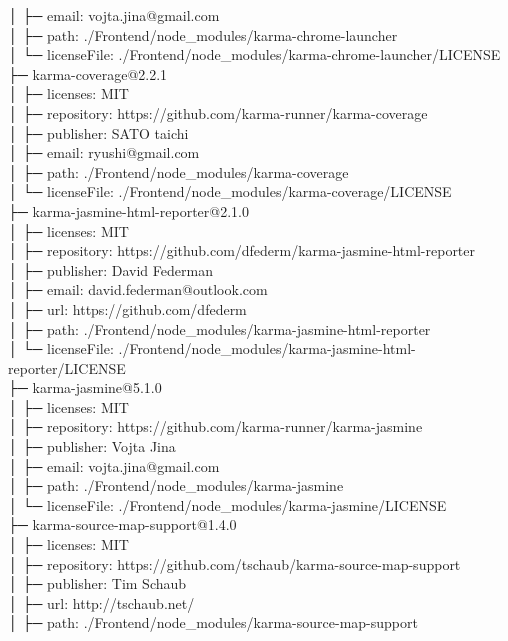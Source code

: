 │  ├─ email: vojta.jina@gmail.com\\
│  ├─ path: ./Frontend/node\_modules/karma-chrome-launcher\\
│  └─ licenseFile: ./Frontend/node\_modules/karma-chrome-launcher/LICENSE\\
├─ karma-coverage@2.2.1\\
│  ├─ licenses: MIT\\
│  ├─ repository: https://github.com/karma-runner/karma-coverage\\
│  ├─ publisher: SATO taichi\\
│  ├─ email: ryushi@gmail.com\\
│  ├─ path: ./Frontend/node\_modules/karma-coverage\\
│  └─ licenseFile: ./Frontend/node\_modules/karma-coverage/LICENSE\\
├─ karma-jasmine-html-reporter@2.1.0\\
│  ├─ licenses: MIT\\
│  ├─ repository: https://github.com/dfederm/karma-jasmine-html-reporter\\
│  ├─ publisher: David Federman\\
│  ├─ email: david.federman@outlook.com\\
│  ├─ url: https://github.com/dfederm\\
│  ├─ path: ./Frontend/node\_modules/karma-jasmine-html-reporter\\
│  └─ licenseFile: ./Frontend/node\_modules/karma-jasmine-html-reporter/LICENSE\\
├─ karma-jasmine@5.1.0\\
│  ├─ licenses: MIT\\
│  ├─ repository: https://github.com/karma-runner/karma-jasmine\\
│  ├─ publisher: Vojta Jina\\
│  ├─ email: vojta.jina@gmail.com\\
│  ├─ path: ./Frontend/node\_modules/karma-jasmine\\
│  └─ licenseFile: ./Frontend/node\_modules/karma-jasmine/LICENSE\\
├─ karma-source-map-support@1.4.0\\
│  ├─ licenses: MIT\\
│  ├─ repository: https://github.com/tschaub/karma-source-map-support\\
│  ├─ publisher: Tim Schaub\\
│  ├─ url: http://tschaub.net/\\
│  ├─ path: ./Frontend/node\_modules/karma-source-map-support\\
